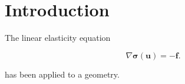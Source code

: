 \section{Introduction}



The linear elasticity equation

\begin{equation}
\nabla \bm{\sigma}(\bm{u}) = - \bm{f}.
\end{equation}

has been applied to a geometry.